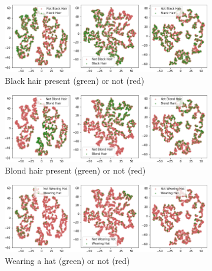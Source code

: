 \begin{figure}
    \centering
    \begin{subfigure}{.49\textwidth}
        \includegraphics[width=\textwidth]{images/latent_spaces/celeba/vlae/vlae_celeba_Black_Hair.png}
        \caption{Black hair present (green) or not (red)}
        \label{subfig:latent_space_celeba_vale_colored_black_hair}
    \end{subfigure}
    \hfill
    \begin{subfigure}{.49\textwidth}
        \includegraphics[width=\textwidth]{images/latent_spaces/celeba/vlae/vlae_celeba_Blond_Hair.png}
        \caption{Blond hair present (green) or not (red)}
        \label{subfig:latent_space_celeba_vale_colored_blond_hair}
    \end{subfigure}
    \begin{subfigure}{.49\textwidth}
        \includegraphics[width=\textwidth]{images/latent_spaces/celeba/vlae/vlae_celeba_Wearing_Hat.png}
        \caption{Wearing a hat (green) or not (red)}
        \label{subfig:latent_space_celeba_vale_colored_waring_hat}
    \end{subfigure}
    \hfill
    \begin{subfigure}{.49\textwidth}

\end{subfigure}
\end{figure}
